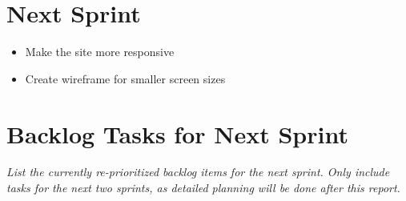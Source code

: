 \documentclass[a4paper,12pt]{article}
\begin{document}
\section{Next Sprint}
\begin{itemize}
    \item Make the site more responsive
    \item Create wireframe for smaller screen sizes
\end{itemize}

\section{Backlog Tasks for Next Sprint}
\textit{List the currently re-prioritized backlog items for the next sprint. Only include tasks for the next two sprints, as detailed planning will be done after this report.}
\end{document}
